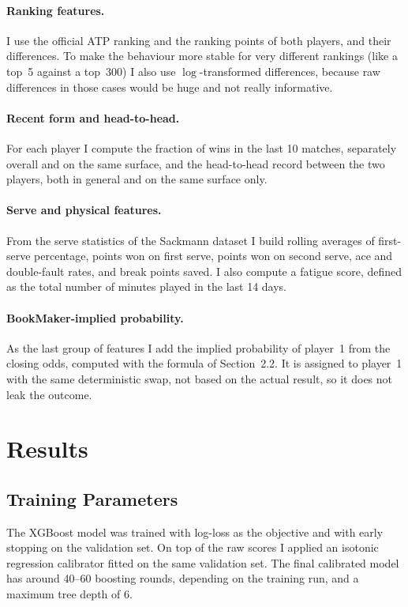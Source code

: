 \documentclass[10pt,twocolumn]{article}
\begin{document}
\paragraph{Ranking features.} I use the official ATP ranking and the
ranking points of both players, and their differences. To make the
behaviour more stable for very different rankings (like a top~5
against a top~300) I also use \(\log\)-transformed differences,
because raw differences in those cases would be huge and not really
informative.

\paragraph{Recent form and head-to-head.} For each player I compute
the fraction of wins in the last 10 matches, separately overall and
on the same surface, and the head-to-head record between the two
players, both in general and on the same surface only.

\paragraph{Serve and physical features.} From the serve statistics of
the Sackmann dataset I build rolling averages of first-serve
percentage, points won on first serve, points won on second serve,
ace and double-fault rates, and break points saved. I also compute a
fatigue score, defined as the total number of minutes played in the
last 14 days.

\paragraph{BookMaker-implied probability.} As the last group of
features I add the implied probability of player~1 from the closing
odds, computed with the formula of Section~2.2. It is assigned to
player~1 with the same deterministic swap, not based on the actual
result, so it does not leak the outcome.

\section{Results}

\subsection{Training Parameters}
The XGBoost model was trained with log-loss as the objective and with
early stopping on the validation set. On top of the raw scores I applied
an isotonic regression calibrator fitted on the same validation set. The
final calibrated model has around 40--60 boosting rounds, depending on
the training run, and a maximum tree depth of 6.
\end{document}
